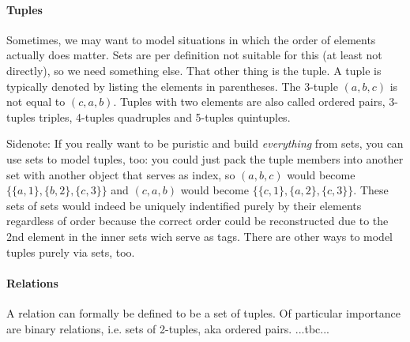 \paragraph{Tuples}
Sometimes, we may want to model situations in which the order of elements actually does matter. Sets are per definition not suitable for this (at least not directly), so we need something else. That other thing is the tuple. A tuple is typically denoted by listing the elements in parentheses. The 3-tuple $(a,b,c)$ is not equal to $(c,a,b)$. Tuples with two elements are also called ordered pairs, 3-tuples triples, 4-tuples quadruples and 5-tuples quintuples.

\medskip 
Sidenote: If you really want to be puristic and build \emph{everything} from sets, you can use sets to model tuples, too: you could just pack the tuple members into another set with another object that serves as index, so $(a,b,c)$ would become $\{\{a,1\},\{b,2\},\{c,3\}\}$ and $(c,a,b)$ would become  $\{\{c,1\},\{a,2\},\{c,3\}\}$. These sets of sets would indeed be uniquely indentified purely by their elements regardless of order because the correct order could be reconstructed due to the 2nd element in the inner sets wich serve as tags. There are other ways to model tuples purely via sets, too.


\paragraph{Relations}
A relation can formally be defined to be a set of tuples. Of particular importance are binary relations, i.e. sets of 2-tuples, aka ordered pairs. ...tbc...

